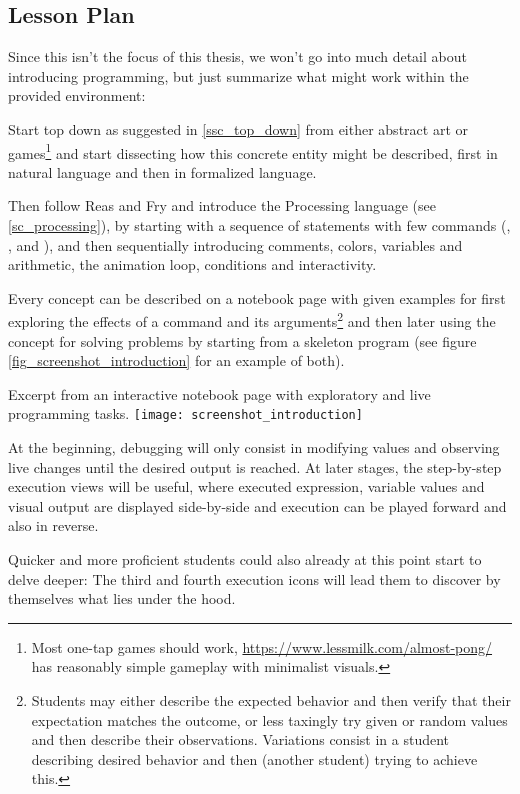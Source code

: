 \subsection{Lesson Plan}

Since this isn't the focus of this thesis, we won't go into much detail about introducing programming, but just summarize what might work within the provided environment:

Start top down as suggested in \ref{ssc_top_down} from either abstract art or games\footnote{Most one-tap games should work, \eg \url{https://www.lessmilk.com/almost-pong/} has reasonably simple gameplay with minimalist visuals.} and start dissecting how this concrete entity might be described, first in natural language and then in formalized language.

Then follow Reas and Fry \cite{Rea14} and introduce the Processing language (see \ref{sc_processing}), by starting with a sequence of statements with few commands (\eg {}, ,  and ), and then sequentially introducing comments, colors, variables and arithmetic, the animation loop, conditions and interactivity.

Every concept can be described on a notebook page with given examples for first exploring the effects of a command and its arguments\footnote{Students may either describe the expected behavior and then verify that their expectation matches the outcome, or less taxingly try given or random values and then describe their observations. Variations consist \eg in a student describing desired behavior and then (another student) trying to achieve this.} and then later using the concept for solving problems by starting from a skeleton program (see figure \ref{fig_screenshot_introduction} for an example of both).

\begin{cfigure}{Excerpt from an interactive notebook page with exploratory and live programming tasks.}
\texttt{[image: screenshot\_introduction]}
\end{cfigure}

At the beginning, debugging will only consist in modifying values and observing live changes until the desired output is reached. At later stages, the step-by-step execution views will be useful, where executed expression, variable values and visual output are displayed side-by-side and execution can be played forward and also in reverse.

Quicker and more proficient students could also already at this point start to delve deeper: The third and fourth execution icons will lead them to discover by themselves what lies under the hood.

